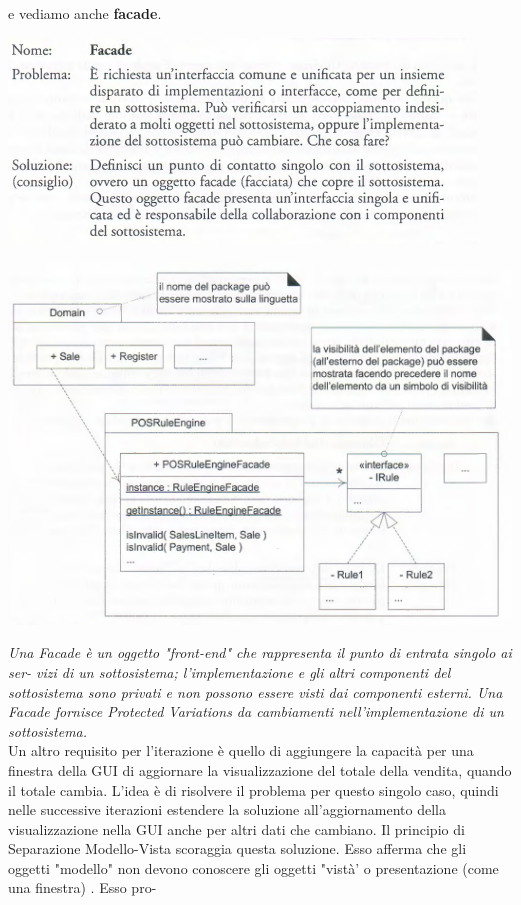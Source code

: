 \documentclass[a4paper,12pt, oneside]{book}
\begin{document}
e vediamo anche \textbf{facade}. 
\begin{center}
\includegraphics[scale = 0.7]{img/gof17.png}
\end{center}
\begin{center}
\includegraphics[scale = 0.7]{img/gof18.png}
\end{center}
\textit{Una Facade è un oggetto "front-end" che rappresenta il punto di entrata singolo ai ser-
vizi di un sottosistema; l'implementazione e gli altri componenti del sottosistema sono
privati e non possono essere visti dai componenti esterni. Una Facade fornisce Protected
Variations da cambiamenti nell'implementazione di un sottosistema.}\\
Un altro requisito per l'iterazione è quello di aggiungere la capacità per una finestra della
GUI di aggiornare la visualizzazione del totale della vendita, quando il totale cambia. L'idea è di risolvere il problema per questo singolo caso, quindi nelle
successive iterazioni estendere la soluzione all'aggiornamento della visualizzazione nella
GUI anche per altri dati che cambiano. Il principio di Separazione Modello-Vista scoraggia questa soluzione. Esso afferma che gli oggetti "modello" non devono conoscere gli oggetti "vistà' o presentazione (come una finestra) . Esso pro-
\end{document}
